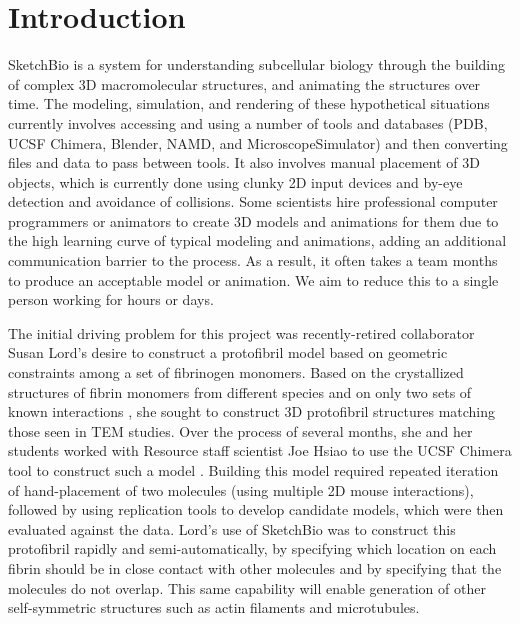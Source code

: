 \documentclass{article} %
\begin{document}
\section{Introduction}
SketchBio is a system for understanding subcellular biology through the building of complex 3D macromolecular structures, and animating the structures over time.   The modeling, simulation, and rendering of these hypothetical situations currently involves accessing and using a number of tools and databases (PDB, UCSF Chimera, Blender, NAMD, and MicroscopeSimulator) and then converting files and data to pass between tools.  It also involves manual placement of 3D objects, which is currently done using clunky 2D input devices and by-eye detection and avoidance of collisions.  Some scientists hire professional computer programmers or animators to create 3D models and animations for them due to the high learning curve of typical modeling and animations, adding an additional communication barrier to the process.  As a result, it often takes a team months to produce an acceptable model or animation.  We aim to reduce this to a single person working for hours or days.

The initial driving problem for this project was recently-retired collaborator Susan Lord's desire to construct a protofibril model based on geometric constraints among a set of fibrinogen monomers.  Based on the crystallized structures of fibrin monomers from different species and on only two sets of known interactions \cite{lord2007fibrinogen}, she sought to construct 3D protofibril structures matching those seen in TEM studies.  Over the process of several months, she and her students worked with Resource staff scientist Joe Hsiao to use the UCSF Chimera tool to construct such a model \cite{lordSubmitted}.  Building this model required repeated iteration of hand-placement of two molecules (using multiple 2D mouse interactions), followed by using replication tools to develop candidate models, which were then evaluated against the data.  Lord's use of SketchBio was to construct this protofibril rapidly and semi-automatically, by specifying which location on each fibrin should be in close contact with other molecules and by specifying that the molecules do not overlap.  This same capability will enable generation of other self-symmetric structures such as actin filaments and microtubules.
\end{document}
